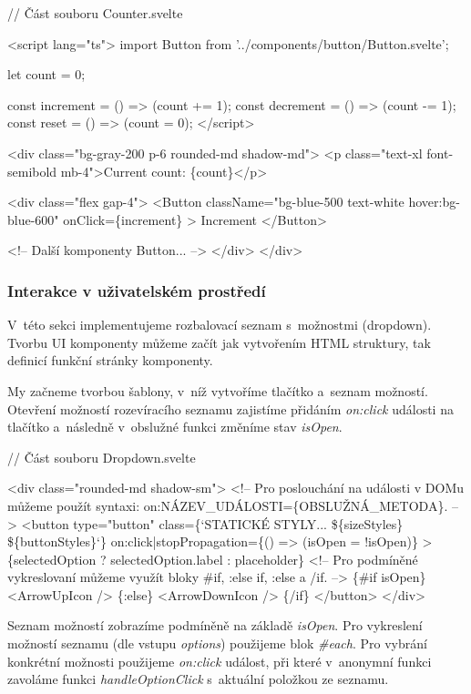 \begin{prog}
// Část souboru Counter.svelte

<script lang="ts">
  import Button from '../components/button/Button.svelte';

  let count = 0;

  const increment = () => (count += 1);
  const decrement = () => (count -= 1);
  const reset = () => (count = 0);
</script>

<div class="bg-gray-200 p-6 rounded-md shadow-md">
  <p class="text-xl font-semibold mb-4">Current count: \{count\}</p>

  <div class="flex gap-4">
    <Button 
      className="bg-blue-500 text-white hover:bg-blue-600" 
      onClick=\{increment\}
    >
      Increment
    </Button>

    <!-- Další komponenty Button... -->
  </div>
</div>
\end{prog}

\subsubsection*{Interakce v uživatelském prostředí}

V~této sekci implementujeme rozbalovací seznam s~možnostmi (dropdown). Tvorbu UI komponenty můžeme začít jak vytvořením HTML struktury, tak definicí funkční stránky komponenty.

My začneme tvorbou šablony, v~níž vytvoříme tlačítko a~seznam možností. 
Otevření možností rozevíracího seznamu zajistíme přidáním \emph{on:click} události na tlačítko a~následně v~obslužné funkci změníme stav \emph{isOpen}.

\begin{prog}
// Část souboru Dropdown.svelte

<div class="rounded-md shadow-sm">
  <!-- Pro poslouchání na události v DOMu můžeme použít syntaxi: 
    on:NÁZEV_UDÁLOSTI=\{OBSLUŽNÁ_METODA\}. -->
  <button
    type="button"
    class=\{`STATICKÉ STYLY... \$\{sizeStyles\} \$\{buttonStyles\}`\}
    on:click|stopPropagation=\{() => (isOpen = !isOpen)\}
  >
    \{selectedOption ? selectedOption.label : placeholder\}
    <!-- Pro podmíněné vykreslovaní můžeme využít bloky
      #if, :else if, :else a /if. -->
    \{#if isOpen\}
      <ArrowUpIcon />
    \{:else\}
      <ArrowDownIcon />
    \{/if\}
  </button>
</div>
\end{prog}

Seznam možností zobrazíme podmíněně na základě \emph{isOpen}. Pro vykreslení možností seznamu (dle vstupu \emph{options}) použijeme blok \emph{\#each}. 
Pro vybrání konkrétní možnosti použijeme \emph{on:click} událost, při které v~anonymní funkci zavoláme funkci \emph{handleOptionClick} s~aktuální položkou ze seznamu.

